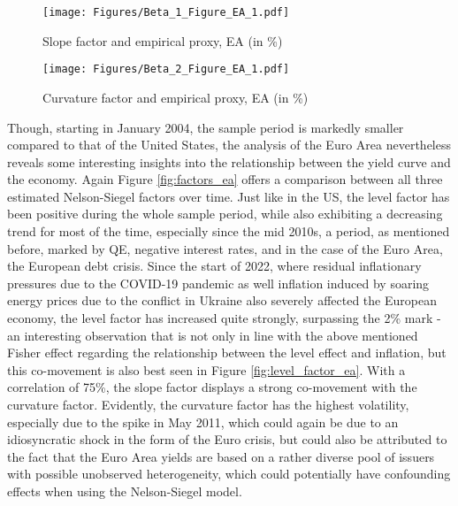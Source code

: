 \begin{figure}[!t]
    \centering
    \texttt{[image: Figures/Beta\_1\_Figure\_EA\_1.pdf]}
    \caption{Slope factor and empirical proxy, EA (in \%)}
    \label{fig:slope_factor_ea}
\end{figure}

\begin{figure}[!t]
    \centering
    \texttt{[image: Figures/Beta\_2\_Figure\_EA\_1.pdf]}
    \caption{Curvature factor and empirical proxy, EA (in \%)}
    \label{fig:curvature_factor_ea}
\end{figure}



Though, starting in January 2004, the sample period is markedly smaller compared to that of the United States, the analysis of the Euro Area nevertheless reveals some interesting insights into the relationship between the yield curve and the economy.
Again Figure \ref{fig:factors_ea} offers a comparison between all three estimated Nelson-Siegel factors over time.
Just like in the US, the level factor has been positive during the whole sample period, while also exhibiting a decreasing trend for most of the time, especially since the mid 2010s, a period, as mentioned before, marked by QE, negative interest rates, and in the case of the Euro Area, the European debt crisis. 
Since the start of 2022, where residual inflationary pressures due to the COVID-19 pandemic as well inflation induced by soaring energy prices due to the conflict in Ukraine also severely affected the European economy, the level factor has increased quite strongly, surpassing the 2\% mark - an interesting observation that is not only in line with the above mentioned Fisher effect regarding the relationship between the level effect and inflation, but this co-movement is also best seen in Figure \ref{fig:level_factor_ea}. 
With a correlation of 75\%, the slope factor displays a strong co-movement with the curvature factor. 
Evidently, the curvature factor has the highest volatility, especially due to the spike in  May 2011, which could again be due to an idiosyncratic shock in the form of the Euro crisis, but could also be attributed  to the fact that the Euro Area yields are based on a rather diverse pool of issuers with possible unobserved heterogeneity, which could potentially have confounding effects when using the Nelson-Siegel model.

